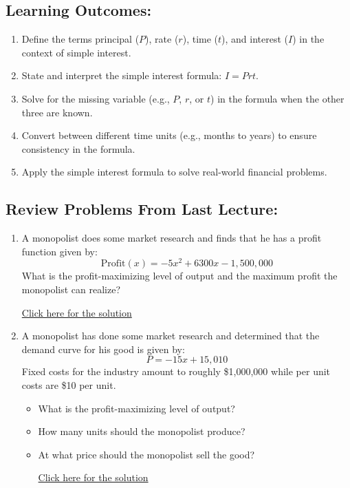 \documentclass[
]{book}
\providecommand{\tightlist}{%
  \setlength{\itemsep}{0pt}\setlength{\parskip}{0pt}}
\begin{document}
\subsection*{Learning Outcomes:}\label{learning-outcomes-6}

\begin{enumerate}
\def\labelenumi{\arabic{enumi}.}
\tightlist
\item
  Define the terms principal (\(P\)), rate (\(r\)), time (\(t\)), and interest (\(I\)) in the context of simple interest.
\item
  State and interpret the simple interest formula: \(I = Prt\).
\item
  Solve for the missing variable (e.g., \(P\), \(r\), or \(t\)) in the formula when the other three are known.
\item
  Convert between different time units (e.g., months to years) to ensure consistency in the formula.
\item
  Apply the simple interest formula to solve real-world financial problems.
\end{enumerate}

\subsection*{Review Problems From Last Lecture:}\label{review-problems-from-last-lecture-5}

\begin{enumerate}
\def\labelenumi{\arabic{enumi}.}
\tightlist
\item
  A monopolist does some market research and finds that he has a profit function given by:
  \[
      \text{Profit}(x) = -5x^2 + 6300x - 1,\!500,\!000
      \]
  What is the profit-maximizing level of output and the maximum profit the monopolist can realize?

  \href{https://youtu.be/M4wUBGg8I7o}{Click here for the solution}
\item
  A monopolist has done some market research and determined that the demand curve for his good is given by:
  \[
      P = -15x + 15,\!010
      \]
  Fixed costs for the industry amount to roughly \$1,000,000 while per unit costs are \$10 per unit.

  \begin{itemize}
  \tightlist
  \item
    What is the profit-maximizing level of output?
  \item
    How many units should the monopolist produce?\\
  \item
    At what price should the monopolist sell the good?

    \href{https://youtu.be/9tuhKbFdCow}{Click here for the solution}
  \end{itemize}
\end{enumerate}
\end{document}
